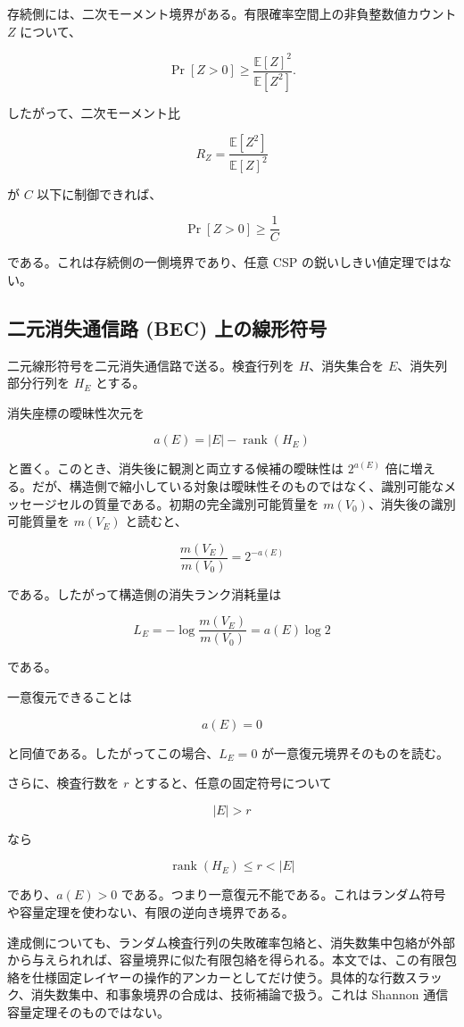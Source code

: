 \documentclass[12pt,a4paper]{article}
\begin{document}
存続側には、二次モーメント境界がある。有限確率空間上の非負整数値カウント \(Z\) について、

\[
\Pr[Z>0]\ge\frac{\mathbb E[Z]^2}{\mathbb E[Z^2]}.
\]

したがって、二次モーメント比

\[
R_{Z}=\frac{\mathbb E[Z^2]}{\mathbb E[Z]^2}
\]

が \(C\) 以下に制御できれば、

\[
\Pr[Z>0]\ge \frac1C
\]

である。これは存続側の一側境界であり、任意 CSP の鋭いしきい値定理ではない。

\subsection{二元消失通信路 (BEC) 上の線形符号}\label{ux4e8cux5143ux6d88ux5931ux901aux4fe1ux8def-bec-ux4e0aux306eux7ddaux5f62ux7b26ux53f7}

二元線形符号を二元消失通信路で送る。検査行列を \(H\)、消失集合を \(E\)、消失列部分行列を \(H_{E}\) とする。

消失座標の曖昧性次元を

\[
a(E)=|E|-\operatorname{rank}(H_{E})
\]

と置く。このとき、消失後に観測と両立する候補の曖昧性は \(2^{a(E)}\) 倍に増える。だが、構造側で縮小している対象は曖昧性そのものではなく、識別可能なメッセージセルの質量である。初期の完全識別可能質量を \(m(V_0)\)、消失後の識別可能質量を \(m(V_{E})\) と読むと、

\[
\frac{m(V_{E})}{m(V_0)}=2^{-a(E)}
\]

である。したがって構造側の消失ランク消耗量は

\[
L_{E}=-\log\frac{m(V_{E})}{m(V_0)}=a(E)\log 2
\]

である。

一意復元できることは

\[
a(E)=0
\]

と同値である。したがってこの場合、\(L_{E}=0\) が一意復元境界そのものを読む。

さらに、検査行数を \(r\) とすると、任意の固定符号について

\[
|E|>r
\]

なら

\[
\operatorname{rank}(H_{E})\le r<|E|
\]

であり、\(a(E)>0\) である。つまり一意復元不能である。これはランダム符号や容量定理を使わない、有限の逆向き境界である。

達成側についても、ランダム検査行列の失敗確率包絡と、消失数集中包絡が外部から与えられれば、容量境界に似た有限包絡を得られる。本文では、この有限包絡を仕様固定レイヤーの操作的アンカーとしてだけ使う。具体的な行数スラック、消失数集中、和事象境界の合成は、技術補論で扱う。これは Shannon 通信容量定理そのものではない。
\end{document}
